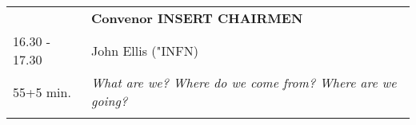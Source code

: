 \begin{longtable}{p{3cm}p{13cm}}
&\hfill {\bf Convenor INSERT CHAIRMEN }\\ 
16.30 - 17.30 & John Ellis ("INFN)\\ 
55+5 min. & {\it What are we? Where do we come from? Where are we going?}\\ 
 & \\ 
\end{longtable}

